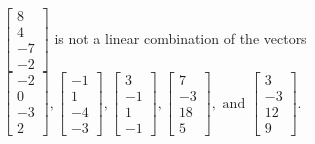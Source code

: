 \begin{exercise}
\begin{exerciseStatement}
  \end{exerciseStatement}
  \begin{exerciseAnswer}
   \(\left[\begin{array}{c}
8 \\
4 \\
-7 \\
-2
\end{array}\right]\) 
  	 is not  
	a linear combination of the vectors \(\left[\begin{array}{c}
-2 \\
0 \\
-3 \\
2
\end{array}\right] , \left[\begin{array}{c}
-1 \\
1 \\
-4 \\
-3
\end{array}\right] , \left[\begin{array}{c}
3 \\
-1 \\
1 \\
-1
\end{array}\right] , \left[\begin{array}{c}
7 \\
-3 \\
18 \\
5
\end{array}\right] , \text{ and } \left[\begin{array}{c}
3 \\
-3 \\
12 \\
9
\end{array}\right]\).

	
  


  \end{exerciseAnswer}
\end{exercise}